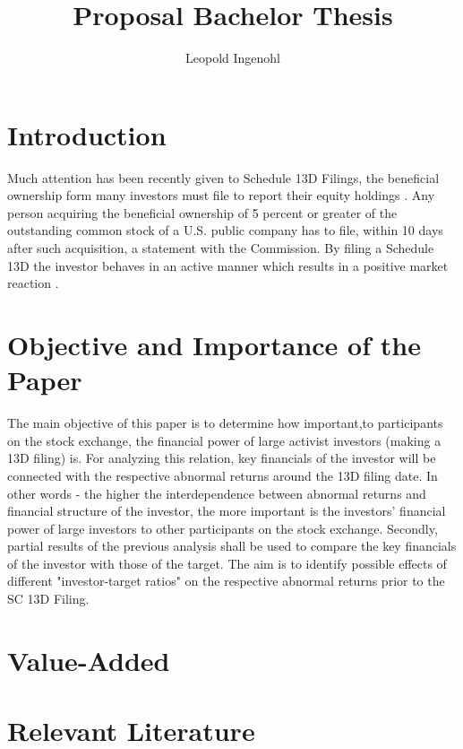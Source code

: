 \documentclass[a4paper,12pt]{article}
\title{Proposal Bachelor Thesis}
\author{Leopold Ingenohl}
\begin{document}
\maketitle

\section{Introduction}
Much attention has been recently given to Schedule 13D Filings, the beneficial ownership form many investors must file to report their equity holdings \citep{Giglia2018}. Any person acquiring the beneficial ownership of 5 percent or greater of the outstanding common stock of a U.S. public company has to file, within 10 days after such acquisition, a statement with the Commission. By filing a Schedule 13D the investor behaves in an active manner which results in a positive market reaction \citep{Brigida2012}.

\section{Objective and Importance of the Paper}
The main objective of this paper is to determine how important,to participants on the stock exchange, the financial power of large activist investors (making a 13D filing) is. For analyzing this relation, key financials of the investor will be connected with the respective abnormal returns around the 13D filing date. In other words - the higher the interdependence between abnormal returns and financial structure of the investor, the more important is the investors' financial power of large investors to other participants on the stock exchange.
Secondly, partial results of the previous analysis shall be used to compare the key financials of the investor with those of the target. The aim is to identify possible effects of different "investor-target ratios" on the respective abnormal returns prior to the SC 13D Filing. 

\section{Value-Added}

\section{Relevant Literature}
\end{document}
